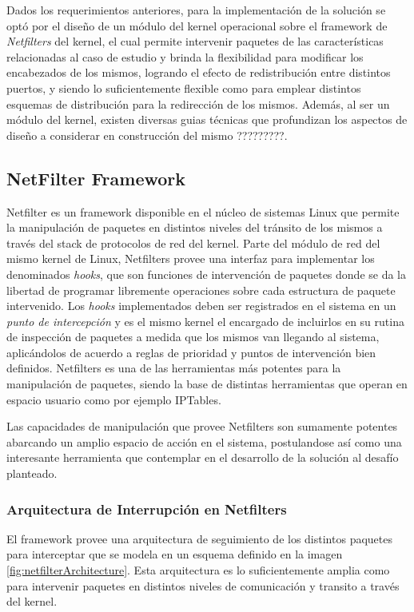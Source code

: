 Dados los requerimientos anteriores, para la implementación de la solución se optó por el diseño de un módulo del kernel operacional sobre el framework de \emph{Netfilters} del kernel, el cual permite intervenir paquetes de las características relacionadas al caso de estudio y brinda la flexibilidad para modificar los encabezados de los mismos, logrando el efecto de redistribución entre distintos puertos, y siendo lo suficientemente flexible como para emplear distintos esquemas de distribución para la redirección de los mismos. Además, al ser un módulo del kernel, existen diversas guias técnicas que profundizan los aspectos de diseño a considerar en construcción del mismo ?????????.

\subsection{NetFilter Framework}
Netfilter \cite{report:netfilterModule} es un framework disponible en el núcleo de sistemas Linux que permite la manipulación de paquetes en distintos niveles del tránsito de los mismos a través del stack de protocolos de red del kernel. Parte del módulo de red del mismo kernel de Linux, Netfilters provee una interfaz para implementar los denominados \emph{hooks}, que son funciones de intervención de paquetes donde se da la libertad de programar libremente operaciones sobre cada estructura de paquete intervenido. Los \emph{hooks} implementados deben ser registrados en el sistema en un \emph{punto de intercepción} y es el mismo kernel el encargado de incluirlos en su rutina de inspección de paquetes a medida que los mismos van llegando al sistema, aplicándolos de acuerdo a reglas de prioridad y puntos de intervención bien definidos. Netfilters es una de las herramientas más potentes para la manipulación de paquetes, siendo la base de distintas herramientas que operan en espacio usuario como por ejemplo IPTables.

Las capacidades de manipulación que provee Netfilters son sumamente potentes abarcando un amplio espacio de acción en el sistema, postulandose así como una interesante herramienta que contemplar en el desarrollo de la solución al desafío planteado.

\subsubsection{Arquitectura de Interrupción en Netfilters}
El framework provee una arquitectura de seguimiento de los distintos paquetes para interceptar que se modela en un esquema definido en la imagen \ref{fig:netfilterArchitecture}. Esta arquitectura es lo suficientemente amplia como para intervenir paquetes en distintos niveles de comunicación y transito a través del kernel.

